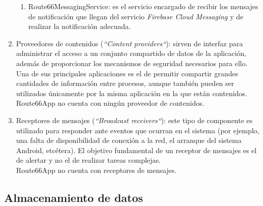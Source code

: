 \documentclass[twoside]{report}
\begin{document}
\begin{enumerate}
\begin{enumerate}
	\item Route66MessagingService: es el servicio encargado de recibir los mensajes de notificación que llegan del servicio \textit{Firebase Cloud Messaging} y de realizar la notificación adecuada.
	\end{enumerate}

\item Proveedores de contenidos (\textit{“Content providers“}): sirven de interfaz para administrar el acceso a un conjunto compartido de datos de la aplicación, además de proporcionar los mecanismos de seguridad necesarios para ello. Una de sus principales aplicaciones es el de permitir compartir grandes cantidades de información entre procesos, aunque también pueden ser utilizados únicamente por la misma aplicación en la que están contenidos.\\
Route66App no cuenta con ningún proveedor de contenidos.

\item Receptores de mensajes (\textit{“Broadcast receivers“}): este tipo de componente es utilizado para responder ante eventos que ocurran en el sistema (por ejemplo, una falta de disponibilidad de conexión a la red, el arranque del sistema Android, etcétera). El objetivo fundamental de un receptor de mensajes es el de alertar y no el de realizar tareas complejas. \\
Route66App no cuenta con receptores de mensajes.
\end{enumerate}

\subsection{Almacenamiento de datos}
\end{document}
